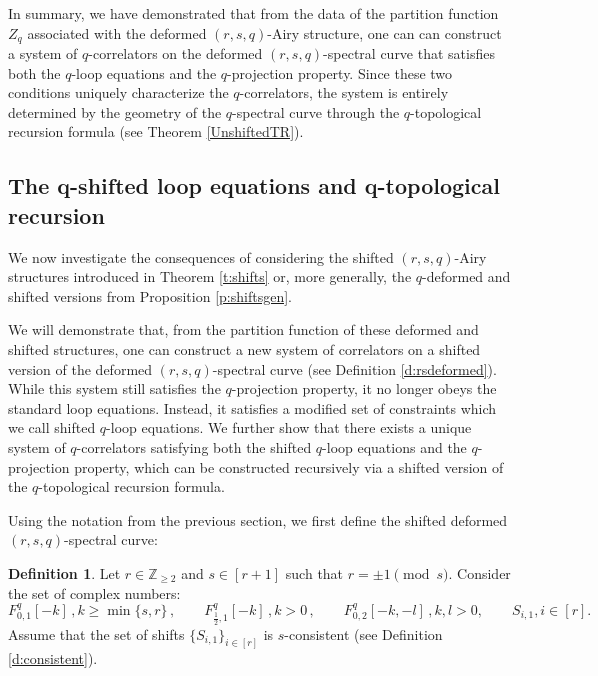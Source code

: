 \documentclass[reqno,11pt]{amsart}
\theoremstyle{plain}
\theoremstyle{definition}
\newtheorem{definition}[theorem]{Definition}
\theoremstyle{remark}
\numberwithin{equation}{section}
\newcommand{\1}{\mathds{1}}
\newcommand{\2}{\frac{1}{2}}
\begin{document}
{								In summary, we have demonstrated that from the data of the partition function $Z_q$ associated with the deformed $(r,s,q)$-Airy structure, one can can construct a system of $q$-correlators on the deformed $(r,s,q)$-spectral curve that satisfies both the $q$-loop equations and the $q$-projection property.
								Since these two conditions uniquely characterize the $q$-correlators, the system is entirely determined by the geometry of the $q$-spectral curve through the $q$-topological recursion formula (see Theorem \ref{UnshiftedTR}).
								
								\subsection{The q-shifted loop equations and q-topological recursion}
								
								We now investigate the consequences of considering the shifted $(r,s,q)$-Airy structures introduced in Theorem \ref{t:shifts} or, more generally, the $q$-deformed and shifted versions from Proposition \ref{p:shiftsgen}.
								
								We will demonstrate that, from the partition function of these deformed and shifted structures, one can construct a new system of correlators on a shifted version of the deformed $(r,s,q)$-spectral curve (see Definition \ref{d:rsdeformed}). While this system still satisfies the $q$-projection property, it no longer obeys the standard loop equations. Instead, it satisfies a modified set of constraints which we call shifted $q$-loop equations. We further show that there exists a unique system of $q$-correlators satisfying both the shifted $q$-loop equations and the $q$-projection property, which can be constructed recursively via a shifted version of the $q$-topological recursion formula.
								
								Using the notation from the previous section, we first define the shifted deformed $(r,s,q)$-spectral curve:
								
								\begin{definition}\label{d:rsdefshift}
									Let $r  \in \mathbb{Z}_{\geq 2}$  and $s \in [r+1]$ such that $r = \pm 1 \pmod{s}$. Consider the set of  complex numbers:
									\begin{equation}
										F^{q}_{0,1}[-k]\,, k \geq \min \{ s, r\} \,, \qquad F^{q}_{\frac{1}{2},1}[-k]\,, k > 0\,, \qquad F^{q}_{0,2}[-k,-l] \,, k,l > 0, \qquad S_{i,1}, i \in [r].
									\end{equation}
									Assume that the set of shifts $\{ S_{i,1} \}_{i \in [r]}$ is $s$-consistent (see Definition \ref{d:consistent}).
									

\end{definition}}
\end{document}
